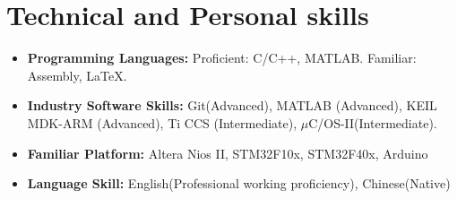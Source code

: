 \documentclass[12pt,a4paper,sans]{moderncv}        %
\begin{document}
\section{Technical and Personal skills}

\vspace{3pt}

\begin{itemize}

\item \textbf{Programming Languages:} Proficient: C/C++, MATLAB. Familiar: Assembly, \LaTeX.

\vspace{6pt}

\item \textbf{Industry Software Skills:} Git(Advanced), MATLAB (Advanced), KEIL MDK-ARM (Advanced), Ti CCS (Intermediate), $\mu$C/OS-II(Intermediate).

\vspace{6pt}

\item \textbf{Familiar Platform:}  Altera Nios II, STM32F10x, STM32F40x, Arduino

\vspace{6pt}

\item \textbf{Language Skill:} English(Professional working proficiency), Chinese(Native)

\vspace{6pt}

\end{itemize}



\nocite{*}



\end{document}
